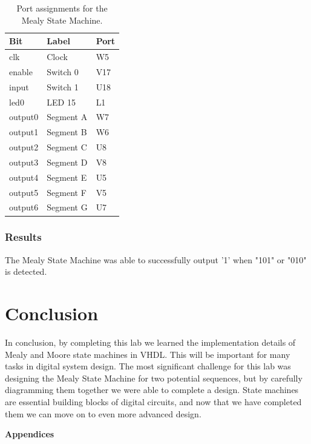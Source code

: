 \documentclass[11pt]{article}
\begin{document}
\begin{table}[H]
\begin{center}
\begin{tabular}{| l | l | l |}
	\hline
	Bit & Label & Port \\ \hline
	clk & Clock & W5 \\ \hline
	enable & Switch 0 & V17 \\ \hline
	input & Switch 1 & U18 \\ \hline
	led0 & LED 15 & L1 \\ \hline
	output0 & Segment A & W7 \\ \hline
	output1 & Segment B & W6 \\ \hline
	output2 & Segment C & U8 \\ \hline
	output3 & Segment D & V8 \\ \hline
	output4 & Segment E & U5 \\ \hline
	output5 & Segment F & V5 \\ \hline
	output6 & Segment G & U7 \\ \hline
\end{tabular}
\caption{\label{tab:mealy_state_ports}Port assignments for the Mealy State Machine.}
\end{center}
\end{table}

\subsubsection{Results}
The Mealy State Machine was able to successfully output '1' when "101" or "010" is detected.

\section{Conclusion}
In conclusion, by completing this lab we learned the implementation details of Mealy and Moore state machines in VHDL. This will be important for many tasks in digital system design. The most significant challenge for this lab was designing the Mealy State Machine for two potential sequences, but by carefully diagramming them together we were able to complete a design. State machines are essential building blocks of digital circuits, and now that we have completed them we can move on to even more advanced design.

\pagebreak

\textbf{Appendices}
\end{document}
